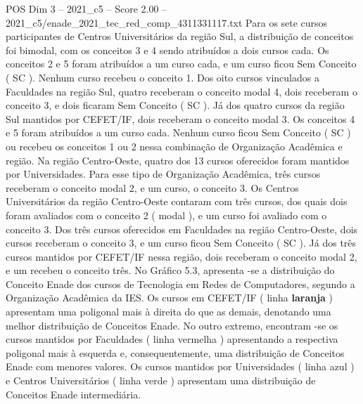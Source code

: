 \begin{textsample}{POS Dim 3 – 2021\_c5 – Score 2.00 – 2021\_c5/enade\_2021\_tec\_red\_comp\_4311331117.txt}
Para os sete cursos participantes de Centros Universitários da região Sul, a distribuição de conceitos foi bimodal, com os conceitos 3 e 4 sendo atribuídos a dois cursos cada.
Os conceitos 2 e 5 foram atribuídos a um curso cada, e um curso ficou Sem Conceito ( SC ).
Nenhum curso recebeu o conceito 1.
Dos oito cursos vinculados a Faculdades na região Sul, quatro receberam o conceito modal 4, dois receberam o conceito 3, e dois ficaram Sem Conceito ( SC ).
Já dos quatro cursos da região Sul mantidos por CEFET/IF, dois receberam o conceito modal 3.
Os conceitos 4 e 5 foram atribuídos a um curso cada.
Nenhum curso ficou Sem Conceito ( SC ) ou recebeu os conceitos 1 ou 2 nessa combinação de Organização Acadêmica e região.
Na região Centro-Oeste, quatro dos 13 cursos oferecidos foram mantidos por Universidades.
Para esse tipo de Organização Acadêmica, três cursos receberam o conceito modal 2, e um curso, o conceito 3.
Os Centros Universitários da região Centro-Oeste contaram com três cursos, dos quais dois foram avaliados com o conceito 2 ( modal ), e um curso foi avaliado com o conceito 3.
Dos três cursos oferecidos em Faculdades na região Centro-Oeste, dois cursos receberam o conceito 3, e um curso ficou Sem Conceito ( SC ).
Já dos três cursos mantidos por CEFET/IF nessa região, dois receberam o conceito modal 2, e um recebeu o conceito três.
No Gráfico 5.3, apresenta -se a distribuição do Conceito Enade dos cursos de Tecnologia em Redes de Computadores, segundo a Organização Acadêmica da IES.
Os cursos em CEFET/IF ( linha \textbf{laranja} ) apresentam uma poligonal mais à direita do que as demais, denotando uma melhor distribuição de Conceitos Enade.
No outro extremo, encontram -se os cursos mantidos por Faculdades ( linha vermelha ) apresentando a respectiva poligonal mais à esquerda e, consequentemente, uma distribuição de Conceitos Enade com menores valores.
Os cursos mantidos por Universidades ( linha azul ) e Centros Universitários ( linha verde ) apresentam uma distribuição de Conceitos Enade intermediária.

\end{textsample}
